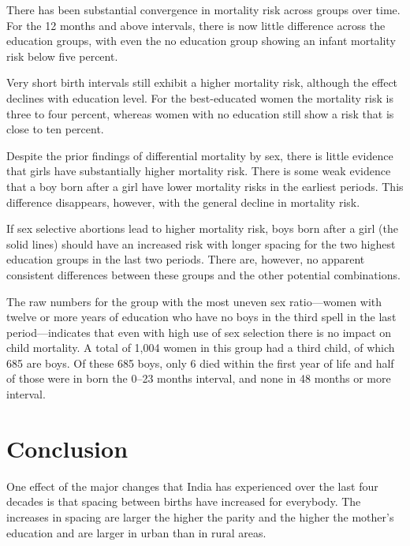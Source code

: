 \documentclass[12pt,letterpaper]{article}
\begin{document}
There has been substantial convergence in mortality risk across groups over time.
For the 12 months and above intervals, there is now little difference across 
the education groups, with even the no education group showing an infant mortality risk 
below five percent.

Very short birth intervals still exhibit a higher mortality risk, although the 
effect declines with education level.
For the best-educated women the mortality risk is three to four percent,
whereas women with no education still show a risk that is close to ten percent.

Despite the prior findings of differential mortality by sex, there is little evidence 
that girls have substantially higher mortality risk.
There is some weak evidence that a boy born after a girl have lower mortality
risks in the earliest periods.
This difference disappears, however, with the general decline in mortality risk. 

If sex selective abortions lead to higher mortality risk, boys born after a girl 
(the solid lines)
should have an increased risk with longer spacing for the two highest education groups 
in the last two periods.
There are, however, no apparent consistent differences between these groups and the other 
potential combinations.

The raw numbers for the group with the most uneven sex ratio---women with twelve or more
years of education who have no boys in the third spell in the last period---indicates
that even with high use of sex selection there is no impact on child mortality.
A total of 1,004 women in this group had a third child, of which 685 are boys.
Of these 685 boys, only 6 died within the first year of life and half of those
were in born the 0--23 months interval, and none in 48 months or more interval.



\section{Conclusion\label{sec:conclusion}}



One effect of the major changes that India has experienced over the last four decades is
that spacing between births have increased for everybody.
The increases in spacing are larger the higher the parity and the higher the mother's 
education and are larger in urban than in rural areas.
\end{document}
